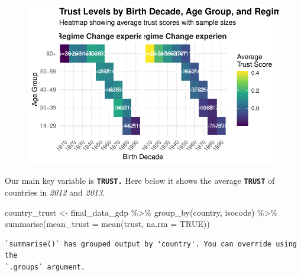 \documentclass[
  letterpaper,
  DIV=11,
  numbers=noendperiod]{scrartcl}
\newenvironment{Shaded}{\begin{snugshade}}{\end{snugshade}}
\newcommand{\AttributeTok}[1]{\textcolor[rgb]{0.40,0.45,0.13}{#1}}
\newcommand{\ConstantTok}[1]{\textcolor[rgb]{0.56,0.35,0.01}{#1}}
\newcommand{\FunctionTok}[1]{\textcolor[rgb]{0.28,0.35,0.67}{#1}}
\newcommand{\NormalTok}[1]{\textcolor[rgb]{0.00,0.23,0.31}{#1}}
\newcommand{\OtherTok}[1]{\textcolor[rgb]{0.00,0.23,0.31}{#1}}
\newcommand{\SpecialCharTok}[1]{\textcolor[rgb]{0.37,0.37,0.37}{#1}}
\begin{document}
\begin{figure}[H]

{\centering \includegraphics{Milestone-2-Data_files/figure-pdf/unnamed-chunk-5-1.pdf}

}

\end{figure}

Our main key variable is \textbf{\texttt{TRUST.}} Here below it shows
the average \textbf{\texttt{TRUST}} of countries in \emph{2012} and
\emph{2013}.

\begin{Shaded}
\begin{Highlighting}[]
\NormalTok{country\_trust }\OtherTok{\textless{}{-}}\NormalTok{ final\_data\_gdp }\SpecialCharTok{\%\textgreater{}\%}
  \FunctionTok{group\_by}\NormalTok{(country, isocode) }\SpecialCharTok{\%\textgreater{}\%}
  \FunctionTok{summarise}\NormalTok{(}\AttributeTok{mean\_trust =} \FunctionTok{mean}\NormalTok{(trust, }\AttributeTok{na.rm =} \ConstantTok{TRUE}\NormalTok{))}
\end{Highlighting}
\end{Shaded}

\begin{verbatim}
`summarise()` has grouped output by 'country'. You can override using the
`.groups` argument.
\end{verbatim}
\end{document}
